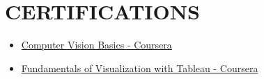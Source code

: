 \section{CERTIFICATIONS}
\begin{itemize}[leftmargin=*]
    \vspace{1mm}
    \item \href{https://www.coursera.org/account/accomplishments/verify/35272FKAXKD8}{Computer Vision Basics - Coursera}  
    \item \href{https://www.coursera.org/account/accomplishments/verify/7RGXCLXRZQFB}{Fundamentals of Visualization with Tableau - Coursera}
\vspace{1mm}
\end{itemize}